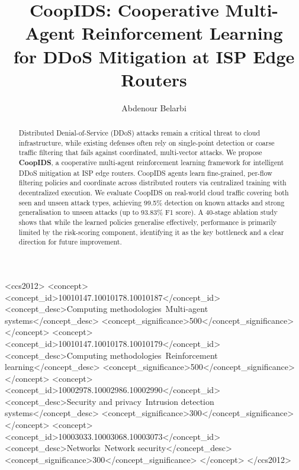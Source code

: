 \documentclass[sigconf,nonacm]{acmart}
\begin{document}
\title{CoopIDS: Cooperative Multi-Agent Reinforcement Learning\\for DDoS Mitigation at ISP Edge Routers}

\author{Abdenour Belarbi}

\renewcommand{\shortauthors}{Belarbi}

\begin{abstract}
Distributed Denial-of-Service (DDoS) attacks remain a critical threat to cloud infrastructure, while existing defenses often rely on single-point detection or coarse traffic filtering that fails against coordinated, multi-vector attacks. We propose \textbf{CoopIDS}, a cooperative multi-agent reinforcement learning framework for intelligent DDoS mitigation at ISP edge routers. CoopIDS agents learn fine-grained, per-flow filtering policies and coordinate across distributed routers via centralized training with decentralized execution. We evaluate CoopIDS on real-world cloud traffic covering both seen and unseen attack types, achieving 99.5\% detection on known attacks and strong generalisation to unseen attacks (up to 93.83\% F1 score). A 40-stage ablation study shows that while the learned policies generalise effectively, performance is primarily limited by the risk-scoring component, identifying it as the key bottleneck and a clear direction for future improvement.
\end{abstract}

\begin{CCSXML}
<ccs2012>
  <concept>
    <concept_id>10010147.10010178.10010187</concept_id>
    <concept_desc>Computing methodologies~Multi-agent systems</concept_desc>
    <concept_significance>500</concept_significance>
  </concept>
  <concept>
    <concept_id>10010147.10010178.10010179</concept_id>
    <concept_desc>Computing methodologies~Reinforcement learning</concept_desc>
    <concept_significance>500</concept_significance>
  </concept>
  <concept>
    <concept_id>10002978.10002986.10002990</concept_id>
    <concept_desc>Security and privacy~Intrusion detection systems</concept_desc>
    <concept_significance>300</concept_significance>
  </concept>
  <concept>
    <concept_id>10003033.10003068.10003073</concept_id>
    <concept_desc>Networks~Network security</concept_desc>
    <concept_significance>300</concept_significance>
  </concept>
</ccs2012>
\end{CCSXML}
\end{document}
